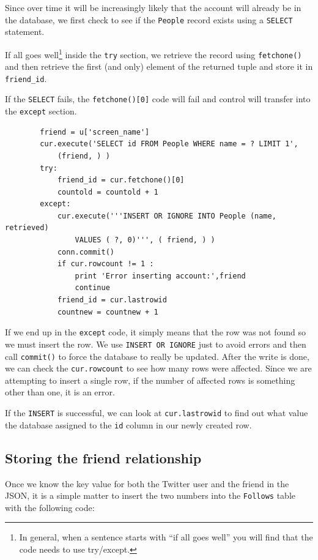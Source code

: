 Since over time it will be increasingly likely that the account
will already be in the database, we first check to see if the
{\tt People} record exists using a {\tt SELECT} statement.

If all goes well\footnote{In general, when a sentence starts 
with ``if all goes well'' you will find that the code needs
to use try/except.} inside the {\tt try} section, we retrieve the
record using {\tt fetchone()} and then retrieve the
first (and only) element of the returned tuple and store it in 
\verb"friend_id".

If the {\tt SELECT} fails, the {\tt fetchone()[0]} code will fail
and control will transfer into the {\tt except} section.

\beforeverb
\begin{verbatim}
        friend = u['screen_name']
        cur.execute('SELECT id FROM People WHERE name = ? LIMIT 1',
            (friend, ) )
        try:
            friend_id = cur.fetchone()[0]
            countold = countold + 1
        except:
            cur.execute('''INSERT OR IGNORE INTO People (name, retrieved) 
                VALUES ( ?, 0)''', ( friend, ) )
            conn.commit()
            if cur.rowcount != 1 :
                print 'Error inserting account:',friend
                continue
            friend_id = cur.lastrowid
            countnew = countnew + 1
\end{verbatim}
\afterverb
%
If we end up in the {\tt except} code, it simply means that the row
was not found so we must insert the row.  We use {\tt INSERT OR 
IGNORE} just to avoid errors and then call {\tt commit()} to 
force the database to really be updated.  After the write is done, we can 
check the {\tt cur.rowcount} to see how many rows were affected.  Since
we are attempting to insert a single row, if the number of 
affected rows is something other than one, it is an error.  

If the {\tt INSERT} is successful, we can look at {\tt cur.lastrowid} 
to find out what value the database assigned to the {\tt id} column in 
our newly created row.

\subsection{Storing the friend relationship}

Once we know the key value for both the Twitter user
and the friend in the JSON, it is a simple matter to insert
the two numbers into the {\tt Follows} table
with the following code:

